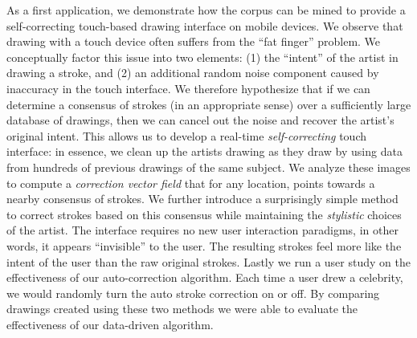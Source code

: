 As a first application, we demonstrate how the \daf corpus can be
mined to provide a self-correcting touch-based drawing interface on
mobile devices. We observe that drawing with a touch device often
suffers from the ``fat finger'' problem. We conceptually factor this issue
into two elements: (1) the ``intent'' of the artist in drawing a
stroke, and (2) an additional random noise component caused by
inaccuracy in the touch interface. We therefore hypothesize that if
we can determine a consensus of strokes (in an appropriate sense)
over a sufficiently large database of drawings, then we can cancel
out the noise and recover the artist's original intent. This allows
us to develop a real-time {\em self-correcting} touch interface: in
essence, we clean up the artists drawing as they draw by using data
from hundreds of previous drawings of the same subject. We analyze
these images to compute a \emph{correction vector field} that for any location,
points towards a nearby consensus of strokes. We further introduce a surprisingly simple
method to correct strokes based on this consensus while maintaining
the {\em stylistic} choices of the artist. The interface requires no new user
interaction paradigms, in other words, it appears
``invisible'' to the user. The resulting strokes feel more like the intent of the user
than the raw original strokes. Lastly we run a user study on the effectiveness of our auto-correction algorithm. 
Each time a user drew a celebrity, we would randomly turn the auto stroke correction on or off. By comparing drawings created using these
two methods we were able to evaluate the effectiveness of our data-driven algorithm.

%












